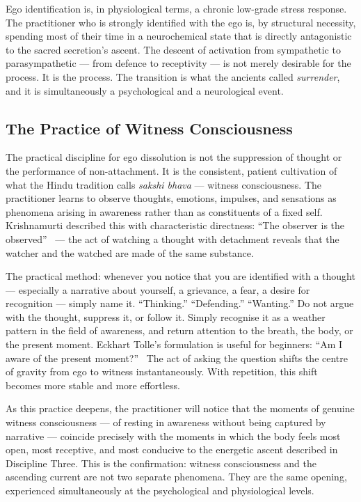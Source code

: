 \documentclass[12pt, a4paper]{article}
\begin{document}
Ego identification is, in physiological terms, a chronic low-grade stress
response. The practitioner who is strongly identified with the ego is, by
structural necessity, spending most of their time in a neurochemical state
that is directly antagonistic to the sacred secretion's ascent. The descent
of activation from sympathetic to parasympathetic — from defence to
receptivity — is not merely desirable for the process. It is the process.
The transition is what the ancients called \emph{surrender}, and it is
simultaneously a psychological and a neurological event.

\subsection{The Practice of Witness Consciousness}

The practical discipline for ego dissolution is not the suppression of thought
or the performance of non-attachment. It is the consistent, patient cultivation
of what the Hindu tradition calls \emph{sakshi bhava} — witness consciousness.
The practitioner learns to observe thoughts, emotions, impulses, and sensations
as phenomena arising in awareness rather than as constituents of a fixed self.
Krishnamurti described this with characteristic directness: ``The observer is
the observed''~\autocite[67]{krishnamurti1954} — the act of watching a thought
with detachment reveals that the watcher and the watched are made of the same
substance.

The practical method: whenever you notice that you are identified with a
thought — especially a narrative about yourself, a grievance, a fear, a desire
for recognition — simply name it. ``Thinking.'' ``Defending.'' ``Wanting.''
Do not argue with the thought, suppress it, or follow it. Simply recognise it
as a weather pattern in the field of awareness, and return attention to the
breath, the body, or the present moment. Eckhart Tolle's formulation is
useful for beginners: ``Am I aware of the present moment?''~\autocite[29]{tolle1997}
The act of asking the question shifts the centre of gravity from ego to
witness instantaneously. With repetition, this shift becomes more stable and
more effortless.

As this practice deepens, the practitioner will notice that the moments of
genuine witness consciousness — of resting in awareness without being captured
by narrative — coincide precisely with the moments in which the body feels
most open, most receptive, and most conducive to the energetic ascent
described in Discipline Three. This is the confirmation: witness consciousness
and the ascending current are not two separate phenomena. They are the same
opening, experienced simultaneously at the psychological and physiological
levels.
\end{document}
